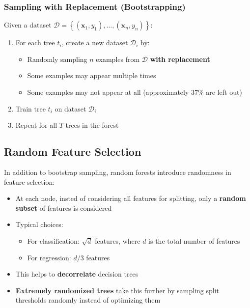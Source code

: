 \documentclass[a4paper]{article}
\theoremstyle{definition}
\begin{document}
\subsubsection{Sampling with Replacement (Bootstrapping)}
Given a dataset \( \mathcal{D} = \left\{ (\mathbf{x}_1, y_1), \ldots, (\mathbf{x}_n, y_n) \right\} \):
\begin{enumerate}
    \item For each tree \( t_i \), create a new dataset \( \mathcal{D}_i \) by:
    \begin{itemize}
        \item Randomly sampling \( n \) examples from \( \mathcal{D} \) \textbf{with replacement}
        \item Some examples may appear multiple times 
        \item Some examples may not appear at all (approximately \( 37\% \) are left out)
    \end{itemize}
    \item Train tree \( t_i \) on dataset \( \mathcal{D}_i \)    
    \item Repeat for all \( T \) trees in the forest
\end{enumerate}
\subsection{Random Feature Selection}
In addition to bootstrap sampling, random forests introduce randomness in feature selection:
\begin{itemize}
    \item At each node, insted of considering all features for splitting, only a \textbf{random subset} of features is considered 
    \item Typical choices:
    \begin{itemize}
        \item For classification: \( \sqrt{d} \) features, where \( d \) is the total number of features 
        \item For regression: \( d/3 \) features 
    \end{itemize}
    \item This helps to \textbf{decorrelate} decision trees 
    \item \textbf{Extremely randomized trees} take this further by sampling split thresholds randomly instead of optimizing them 
\end{itemize}
\end{document}
